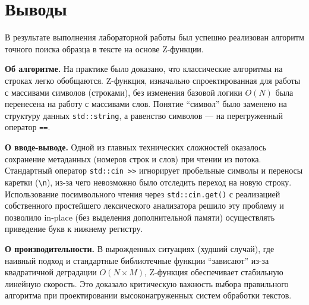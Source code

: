 \section{Выводы}

В результате выполнения лабораторной работы был успешно реализован алгоритм точного поиска образца в тексте на основе Z-функции.

\textbf{Об алгоритме.} На практике было доказано, что классические алгоритмы на строках легко обобщаются. Z-функция, изначально спроектированная для работы с массивами символов (строками), без изменения базовой логики $O(N)$ была перенесена на работу с массивами слов. Понятие \enquote{символ} было заменено на структуру данных \texttt{std::string}, а равенство символов — на перегруженный оператор \texttt{==}.

\textbf{О вводе-выводе.} Одной из главных технических сложностей оказалось сохранение метаданных (номеров строк и слов) при чтении из потока. Стандартный оператор \texttt{std::cin >>} игнорирует пробельные символы и переносы каретки (\texttt{\textbackslash n}), из-за чего невозможно было отследить переход на новую строку. Использование посимвольного чтения через \texttt{std::cin.get()} с реализацией собственного простейшего лексического анализатора решило эту проблему и позволило in-place (без выделения дополнительной памяти) осуществлять приведение букв к нижнему регистру.

\textbf{О производительности.} В вырожденных ситуациях (худший случай), где наивный подход и стандартные библиотечные функции \enquote{зависают} из-за квадратичной деградации $O(N \times M)$, Z-функция обеспечивает стабильную линейную скорость. Это доказало критическую важность выбора правильного алгоритма при проектировании высоконагруженных систем обработки текстов.
\pagebreak